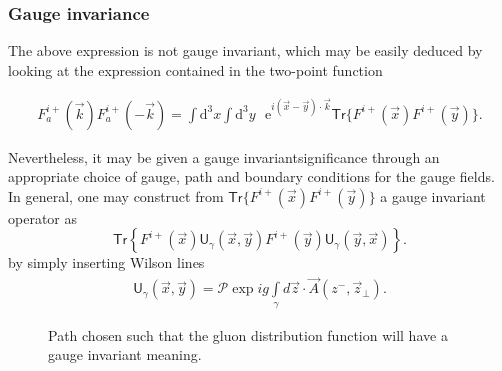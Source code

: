 \subsubsection*{Gauge invariance}
The above expression is not gauge invariant, which may be easily deduced by looking at the expression contained in the two-point function
\begin{fullwidth}
\begin{align}\label{glasma32}
    F_{a}^{i+}(\vec{k}) F_{a}^{i+}(-\vec{k})=\int \mathrm{d}^{3} x \int \mathrm{d}^{3} y \text{  }\mathrm{e}^{i(\vec{x}-\vec{y}) \cdot \vec{k}} \textsf{Tr}\{F^{i+}(\vec{x})F^{i+}(\vec{y})\}.
\end{align}
\end{fullwidth}
Nevertheless, it may be given a gauge invariantsignificance through an appropriate choice of gauge, path and boundary conditions for the gauge fields. In general, one may construct from $\textsf{Tr}\{F^{i+}(\vec{x})F^{i+}(\vec{y})\}$ a gauge invariant operator as 
\begin{equation}\label{glasma22}
    \textsf{Tr}\left\{F^{i+}(\vec{x}) \textsf{U}_{\gamma}(\vec{x}, \vec{y}) F^{i+}(\vec{y}) \textsf{U}_{\gamma}(\vec{y}, \vec{x})\right\}.
\end{equation}
by simply inserting Wilson lines
\begin{align*}
    \textsf{U}_{\gamma}(\vec{x}, \vec{y})=\mathcal{P} \exp{i g \int\limits_{\gamma} d \vec{z} \cdot \vec{A}(z^-,\vec{z}_\perp)}.
\end{align*}

\begin{figure}[!hbt]
	\centering
    
    \caption{\normalsize Path chosen such that the gluon distribution function will have a gauge invariant meaning.}
\end{figure}


